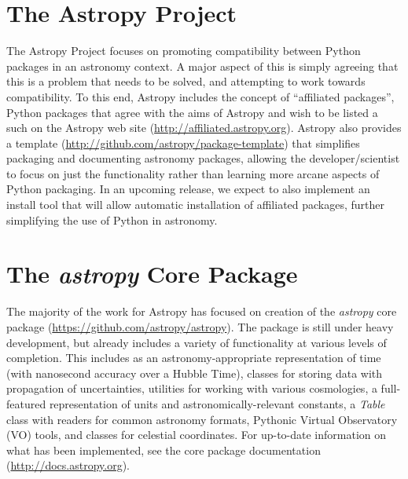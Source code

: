 \section{The Astropy Project}
The Astropy Project focuses on promoting compatibility between Python packages in an astronomy context.  A major aspect of this is simply agreeing that this is a problem that needs to be solved, and attempting to work towards compatibility.  To this end, Astropy includes the concept of ``affiliated packages'', Python packages that agree with the aims of Astropy and wish to be listed a such on the Astropy web site (\url{http://affiliated.astropy.org}).  Astropy also provides a template (\url{http://github.com/astropy/package-template}) that simplifies packaging and documenting astronomy packages, allowing the developer/scientist to focus on just the functionality rather than learning more arcane aspects of Python packaging.  In an upcoming release, we expect to also implement an install tool that will allow automatic installation of affiliated packages, further simplifying the use of Python in astronomy.

\section{The {\it astropy} Core Package} 
The majority of the work for Astropy has focused on creation of the {\it astropy} core package (\url{https://github.com/astropy/astropy}).  The package is still under heavy development, but already includes a variety of functionality at various levels of completion.  This includes as an astronomy-appropriate representation of time (with nanosecond accuracy over a Hubble Time), classes for storing data with propagation of uncertainties, utilities for working with various cosmologies, a full-featured representation of units and astronomically-relevant constants, a {\it Table} class with readers for common astronomy formats, Pythonic Virtual Observatory (VO) tools, and classes for celestial coordinates.  For up-to-date information on what has been implemented, see the core package documentation (\url{http://docs.astropy.org}).

